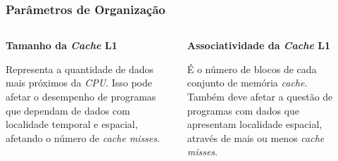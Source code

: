 \documentclass{beamer}
\begin{document}
    \begin{frame}
        \frametitle{Parâmetros de Organização}

        \begin{columns}
            \begin{column}{0.3\textwidth}

                \begin{center}

                    \Large
                    \textbf{Tamanho da \textit{Cache} L1}
                \end{center}

                \justifying
                \footnotesize
                Representa a quantidade de dados mais próximos da \textit{CPU}. Isso pode afetar o desempenho
                de programas que dependam de dados com localidade temporal e espacial, afetando o número de
                \textit{cache misses}.

            \end{column}

            \begin{column}{0.3\textwidth}

                \begin{center}

                    \Large
                    \textbf{Associatividade da \textit{Cache} L1}
                \end{center}

                \justifying
                \footnotesize
                É o número de blocos de cada conjunto de memória \textit{cache}. Também deve afetar a questão
                de programas com dados que apresentam localidade espacial, através de mais ou menos \textit{cache misses}.

            \end{column}

            \begin{column}{0.3\textwidth}

                \begin{center}


\end{center}
\end{column}
\end{columns}
\end{frame}
\end{document}
